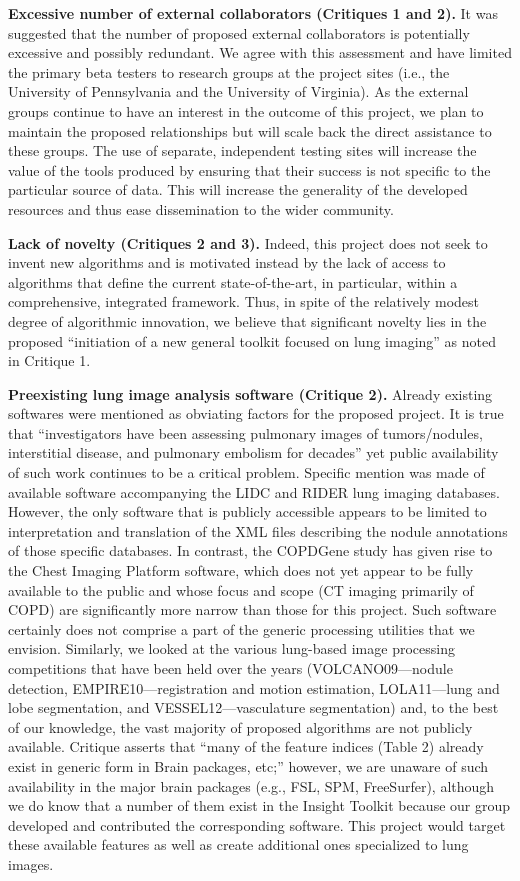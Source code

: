 \documentclass[11pt,]{article}
\begin{document}
\textbf{Excessive number of external collaborators (Critiques 1 and 2).}
It was suggested that the number of proposed external collaborators is
potentially excessive and possibly redundant. We agree with this
assessment and have limited the primary beta testers to research groups
at the project sites (i.e., the University of Pennsylvania and the
University of Virginia). As the external groups continue to have an
interest in the outcome of this project, we plan to maintain the
proposed relationships but will scale back the direct assistance to
these groups. The use of separate, independent testing sites will
increase the value of the tools produced by ensuring that their success
is not specific to the particular source of data. This will increase the
generality of the developed resources and thus ease dissemination to the
wider community.

\textbf{Lack of novelty (Critiques 2 and 3).} Indeed, this project does
not seek to invent new algorithms and is motivated instead by the lack
of access to algorithms that define the current state-of-the-art, in
particular, within a comprehensive, integrated framework. Thus, in spite
of the relatively modest degree of algorithmic innovation, we believe
that significant novelty lies in the proposed ``initiation of a new
general toolkit focused on lung imaging'' as noted in Critique 1.

\textbf{Preexisting lung image analysis software (Critique 2).} Already
existing softwares were mentioned as obviating factors for the proposed
project. It is true that ``investigators have been assessing pulmonary
images of tumors/nodules, interstitial disease, and pulmonary embolism
for decades'' yet public availability of such work continues to be a
critical problem. Specific mention was made of available software
accompanying the LIDC and RIDER lung imaging databases. However, the
only software that is publicly accessible appears to be limited to
interpretation and translation of the XML files describing the nodule
annotations of those specific databases. In contrast, the COPDGene study
has given rise to the Chest Imaging Platform software, which does not
yet appear to be fully available to the public and whose focus and scope
(CT imaging primarily of COPD) are significantly more narrow than those
for this project. Such software certainly does not comprise a part of
the generic processing utilities that we envision. Similarly, we looked
at the various lung-based image processing competitions that have been
held over the years (VOLCANO09---nodule detection,
EMPIRE10---registration and motion estimation, LOLA11---lung and lobe
segmentation, and VESSEL12---vasculature segmentation) and, to the best
of our knowledge, the vast majority of proposed algorithms are not
publicly available. Critique asserts that ``many of the feature indices
(Table 2) already exist in generic form in Brain packages, etc;''
however, we are unaware of such availability in the major brain packages
(e.g., FSL, SPM, FreeSurfer), although we do know that a number of them
exist in the Insight Toolkit because our group developed and contributed
the corresponding software. This project would target these available
features as well as create additional ones specialized to lung images.
\end{document}
